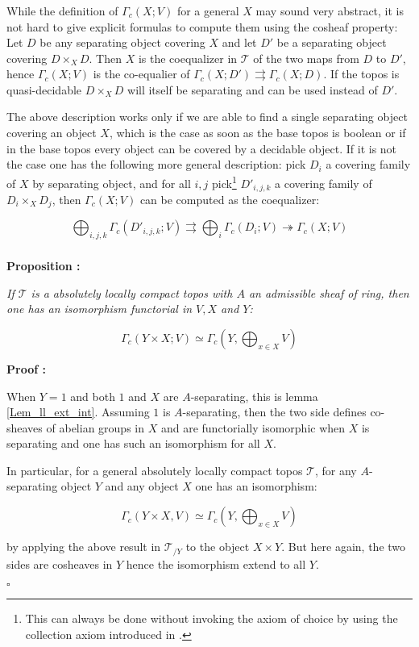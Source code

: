 \documentclass[a4paper]{article}
\newcommand{\Tcal}{\mathcal{T}}
\newcommand{\block}[1]
{

\par \subsubsection{} #1

\bigskip}
\newcommand{\Prop}[1]
	{

	\bigskip
	
	\textbf{Proposition : }{\itshape #1}
		
	\bigskip
	
	}
\newcommand{\Dem}[1]{
	
	\smallskip
	
	\textbf{Proof : } \par
	 {#1} $\square$
	 
	 \bigskip
}
\begin{document}
\block{While the definition of $\Gamma_c(X;V)$ for a general $X$ may sound very abstract, it is not hard to give explicit formulas to compute them using the cosheaf property: Let $D$ be any separating object covering $X$ and let $D'$ be a separating object covering $D \times_X D$. Then $X$ is the coequalizer in $\Tcal$ of the two maps from $D$ to $D'$, hence $\Gamma_c(X;V)$ is the co-equalier of $\Gamma_c(X;D') \rightrightarrows \Gamma_c(X;D)$. If the topos is quasi-decidable $D \times_X D$ will itself be separating and can be used instead of $D'$.


The above description works only if we are able to find a single separating object covering an object $X$, which is the case as soon as the base topos is boolean or if in the base topos every object can be covered by a decidable object. If it is not the case one has the following more general description: pick $D_i$ a covering family of $X$ by separating object, and for all $i,j$ pick\footnote{This can always be done without invoking the axiom of choice by using the collection axiom introduced in \cite{shulman2010stack}.} $D'_{i,j,k}$ a covering family of $D_i \times_X D_j$, then $\Gamma_c(X;V)$ can be computed as the coequalizer:

\[ \bigoplus_{i,j,k} \Gamma_c(D'_{i,j,k};V) \rightrightarrows \bigoplus_i \Gamma_c(D_i;V) \twoheadrightarrow \Gamma_c(X;V)  \]

}


\block{\label{Prop_Gammac_exchange}\Prop{If $\Tcal$ is a absolutely locally compact topos with $A$ an admissible sheaf of ring, then one has an isomorphism functorial in $V,X$ and $Y$:

\[ \Gamma_c( Y \times X;V) \simeq \Gamma_c \left( Y,\bigoplus_{x \in X} V \right) \]

}
\Dem{When $Y=1$ and both $1$ and $X$ are $A$-separating, this is lemma \ref{Lem_ll_ext_int}. Assuming $1$ is $A$-separating, then the two side defines co-sheaves of abelian groups in $X$ and are functorially isomorphic when $X$ is separating and one has such an isomorphism for all $X$.

In particular, for a general absolutely locally compact topos $\Tcal$, for any $A$-separating object $Y$ and any object $X$ one has an isomorphism:

\[ \Gamma_c(Y \times X, V) \simeq \Gamma_c(Y, \bigoplus_{x \in X} V) \]

by applying the above result in $\Tcal_{/Y}$ to the object $X\times Y$. But here again, the two sides are cosheaves in $Y$ hence the isomorphism extend to all $Y$.
}  
}
\end{document}
